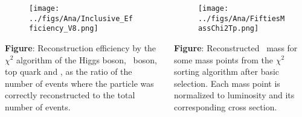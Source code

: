 \begin{frame}{}
\vspace{-.2cm}

\begin{columns}
\begin{column}{.50\textwidth}

\begin{figure}[!Hhtbp]
  \begin{center}
    \texttt{[image: ../figs/Ana/Inclusive\_Efficiency\_V8.png]}
  \end{center}
\end{figure}

\vspace{-.2cm}
\begin{block}{}
\scriptsize \textbf{Figure}: Reconstruction efficiency by the $\chi^{2}$ algorithm of the Higgs boson, \W~boson, top quark and \Tp, as the ratio of the number of events where the particle was correctly reconstructed to the total number of events.
\end{block}
\end{column}

\begin{column}{.50\textwidth}

\begin{figure}[!Hhtbp]
  \begin{center}
    \texttt{[image: ../figs/Ana/FiftiesMassChi2Tp.png]}
  \end{center}
\end{figure}

\vspace{-.2cm}
\begin{block}{}
\scriptsize \textbf{Figure}: Reconstructed \Tp~mass for some mass points from the $\chi^{2}$ sorting algorithm after basic selection. Each mass point is normalized to luminosity and its corresponding cross section.
\end{block}
\end{column}

\end{columns}
\end{frame}